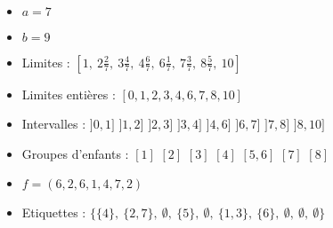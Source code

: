 \begin{expl}[$a < b$]
    ~
    \begin{itemize}
        \item $a = 7$
        \item $b = 9$
        \item Limites : $[1,\ 2 \frac{2}{7},\ 
            3 \frac{4}{7},\ 4 \frac{6}{7},\  
            6 \frac{1}{7},\ 7 \frac{3}{7},\ 
            8 \frac{5}{7},\ 10]$
        \item Limites entières : $[0,1,2,3,4,6,7,8,10]$
        \item Intervalles :
            \subitem $]0, 1]$ \hspace{5mm} $]1, 2]$
            \hspace{5mm} $]2, 3]$ \hspace{5mm} $]3, 4]$
            \hspace{5mm} $]4, 6]$ \hspace{5mm} $]6, 7]$
            \hspace{5mm} $]7, 8]$ \hspace{5mm} $]8, 10]$
        \item Groupes d'enfants :
            \subitem $[1]$ \hspace{5mm} $[2]$ \hspace{5mm}
            $[3]$ \hspace{5mm} $[4]$ \hspace{5mm}
            $[5,6]$ \hspace{5mm} $[7]$ \hspace{5mm} $[8]$
        \item $f = (6,2,6,1,4,7,2)$
        \item Etiquettes : $\{\{4\},\ \{2,7\},\ \emptyset,\ 
            \{5\},\ \emptyset,\ \{1,3\},\ \{6\},\ 
            \emptyset,\ \emptyset,\ \emptyset\}$\\
    \end{itemize}
    
\end{expl}

